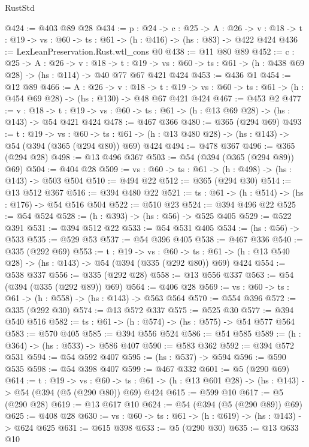 \begin{lexlean}{RustStd}
\begin{coremodule}
{\begin{coremodule}
{{{{{{{{@424 := @403 @89 @28
@434 := {p : @24} ->
  {c : @25} ->
  {A : @26} ->
  {v : @18} -> {t : @19} -> {vs : @60} -> {ts : @61} -> (h : @416) -> (hs : @83) -> @422 @424
@436 := LexLeanPreservation.Rust.wtl_cons @0
@438 := @11 @80 @89
@452 := {c : @25} ->
  {A : @26} ->
  {v : @18} ->
  {t : @19} ->
  {vs : @60} -> {ts : @61} -> (h : @438 @69 @28) -> (hs : @114) -> @40 @77 @67 @421 @424
@453 := @436 @1
@454 := @12 @89
@466 := {A : @26} ->
  {v : @18} ->
  {t : @19} -> {vs : @60} -> {ts : @61} -> (h : @454 @69 @28) -> (hs : @130) -> @48 @67 @421 @424
@467 := @453 @2
@477 := {v : @18} ->
  {t : @19} -> {vs : @60} -> {ts : @61} -> (h : @13 @69 @28) -> (hs : @143) -> @54 @421 @424
@478 := @467 @366
@480 := @365 (@294 @69)
@493 := {t : @19} ->
  {vs : @60} ->
  {ts : @61} -> (h : @13 @480 @28) -> (hs : @143) -> @54 (@394 (@365 (@294 @80)) @69) @424
@494 := @478 @367
@496 := @365 (@294 @28)
@498 := @13 @496 @367
@503 := @54 (@394 (@365 (@294 @89)) @69)
@504 := @404 @28
@509 := {vs : @60} -> {ts : @61} -> (h : @498) -> (hs : @143) -> @503 @504
@510 := @494 @22
@512 := @365 (@294 @30)
@514 := @13 @512 @367
@516 := @394 @480 @22
@521 := {ts : @61} -> (h : @514) -> (hs : @176) -> @54 @516 @504
@522 := @510 @23
@524 := @394 @496 @22
@525 := @54 @524
@528 := (h : @393) -> (hs : @56) -> @525 @405
@529 := @522 @391
@531 := @394 @512 @22
@533 := @54 @531 @405
@534 := (hs : @56) -> @533
@535 := @529 @53
@537 := @54 @396 @405
@538 := @467 @336
@540 := @335 (@292 @69)
@553 := {t : @19} ->
  {vs : @60} ->
  {ts : @61} -> (h : @13 @540 @28) -> (hs : @143) -> @54 (@394 (@335 (@292 @80)) @69) @424
@554 := @538 @337
@556 := @335 (@292 @28)
@558 := @13 @556 @337
@563 := @54 (@394 (@335 (@292 @89)) @69)
@564 := @406 @28
@569 := {vs : @60} -> {ts : @61} -> (h : @558) -> (hs : @143) -> @563 @564
@570 := @554 @396
@572 := @335 (@292 @30)
@574 := @13 @572 @337
@575 := @525 @30
@577 := @394 @540 @516
@582 := {ts : @61} -> (h : @574) -> (hs : @575) -> @54 @577 @564
@583 := @570 @405
@585 := @394 @556 @524
@586 := @54 @585
@589 := (h : @364) -> (hs : @533) -> @586 @407
@590 := @583 @362
@592 := @394 @572 @531
@594 := @54 @592 @407
@595 := (hs : @537) -> @594
@596 := @590 @535
@598 := @54 @398 @407
@599 := @467 @332
@601 := @5 (@290 @69)
@614 := {t : @19} ->
  {vs : @60} ->
  {ts : @61} -> (h : @13 @601 @28) -> (hs : @143) -> @54 (@394 (@5 (@290 @80)) @69) @424
@615 := @599 @10
@617 := @5 (@290 @28)
@619 := @13 @617 @10
@624 := @54 (@394 (@5 (@290 @89)) @69)
@625 := @408 @28
@630 := {vs : @60} -> {ts : @61} -> (h : @619) -> (hs : @143) -> @624 @625
@631 := @615 @398
@633 := @5 (@290 @30)
@635 := @13 @633 @10
}}}}}}}}
\end{coremodule}}
\end{coremodule}
\end{lexlean}
